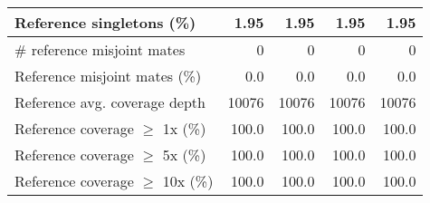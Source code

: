 \documentclass[12pt,a4paper]{article}
\begin{document}
\begin{table}[ht]
\begin{center}
\begin{tabular}{|l*{4}{|r}|}
Reference singletons (\%) & 1.95 & 1.95 & 1.95 & 1.95 \\ \hline
\# reference misjoint mates & 0 & 0 & 0 & 0 \\ \hline
Reference misjoint mates (\%) & 0.0 & 0.0 & 0.0 & 0.0 \\ \hline
Reference avg. coverage depth & 10076 & 10076 & 10076 & 10076 \\ \hline
Reference coverage $\geq$ 1x (\%) & 100.0 & 100.0 & 100.0 & 100.0 \\ \hline
Reference coverage $\geq$ 5x (\%) & 100.0 & 100.0 & 100.0 & 100.0 \\ \hline
Reference coverage $\geq$ 10x (\%) & 100.0 & 100.0 & 100.0 & 100.0 \\ \hline
\end{tabular}
\end{center}
\end{table}
\end{document}
